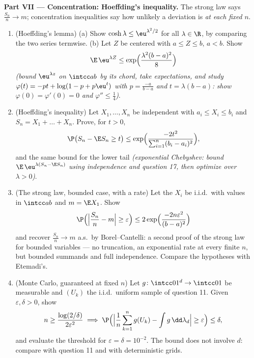 \begin{problem}
\medskip
\noindent\textbf{Part VII --- Concentration: Hoeffding's
inequality.} The strong law says $\frac{S_n}n \to m$;
concentration inequalities say how unlikely a deviation is
\emph{at each fixed $n$}.
\begin{enumerate}[resume]
  \item (Hoeffding's lemma)
        (a) Show $\cosh\lambda \leq \eu^{\lambda^2/2}$ for
        all $\lambda \in \R$, by comparing the two series
        termwise.
        (b) Let $Z$ be centered with $a \leq Z \leq b$,
        $a < b$. Show
        \[
        \E\,\eu^{\lambda Z} \leq
        \exp\Bigl(\frac{\lambda^2(b - a)^2}8\Bigr)
        \]
        \emph{(bound $\eu^{\lambda z}$ on $\intcc ab$ by
        its chord, take expectations, and study $\varphi(t)
        = -pt + \log(1 - p + p\eu^t)$ with $p =
        \frac{-a}{b-a}$ and $t = \lambda(b - a)$: show
        $\varphi(0) = \varphi'(0) = 0$ and $\varphi''
        \leq \frac14$)}.
  \item (Hoeffding's inequality) Let $X_1, \dots, X_n$ be
        independent with $a_i \leq X_i \leq b_i$ and $S_n =
        X_1 + \dots + X_n$. Prove, for $t > 0$,
        \[
        \P\bigl(S_n - \E S_n \geq t\bigr) \leq
        \exp\Bigl(\frac{-2t^2}{\sum_{i=1}^n(b_i -
        a_i)^2}\Bigr),
        \]
        and the same bound for the lower tail
        \emph{(exponential Chebyshev: bound
        $\E\,\eu^{\lambda(S_n - \E S_n)}$ using
        independence and question 17, then optimize over
        $\lambda > 0$)}.
  \item (The strong law, bounded case, with a rate) Let the
        $X_i$ be i.i.d.\ with values in $\intcc ab$ and $m
        = \E X_1$. Show
        \[
        \P\Bigl(\Bigl|\frac{S_n}n - m\Bigr| \geq
        \varepsilon\Bigr) \leq
        2\exp\Bigl(\frac{-2n\varepsilon^2}{(b - a)^2}\Bigr)
        \]
        and recover $\frac{S_n}n \to m$ a.s.\ by
        Borel--Cantelli: a second proof of the strong law
        for bounded variables --- no truncation, an
        exponential rate at every finite $n$, but bounded
        summands and full independence. Compare the
        hypotheses with Etemadi's.
  \item (Monte Carlo, guaranteed at fixed $n$) Let $g
        \colon \intcc01^d \to \intcc01$ be measurable and
        $(U_k)$ the i.i.d.\ uniform sample of question 11.
        Given $\varepsilon, \delta > 0$, show
        \[
        n \geq \frac{\log(2/\delta)}{2\varepsilon^2}
        \implies
        \P\Bigl(\Bigl|\frac1n\sum_{k=1}^ng(U_k) -
        \int g\,\dd\lambda_d\Bigr| \geq \varepsilon\Bigr)
        \leq \delta,
        \]
        and evaluate the threshold for $\varepsilon =
        \delta = 10^{-2}$. The bound does not involve $d$:
        compare with question 11 and with deterministic
        grids.
\end{enumerate}


\end{problem}
